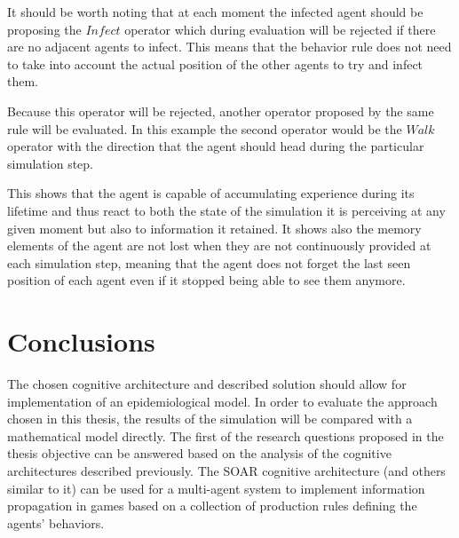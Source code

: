 It should be worth noting that at each moment the infected agent should be proposing the $Infect$ operator which during evaluation will be rejected if there are no adjacent agents to infect.
This means that the behavior rule does not need to take into account the actual position of the other agents to try and infect them.

Because this operator will be rejected, another operator proposed by the same rule will be evaluated.
In this example the second operator would be the $Walk$ operator with the direction that the agent should head during the particular simulation step.

This shows that the agent is capable of accumulating experience during its lifetime and thus react to both the state of the simulation it is perceiving at any given moment but also to information it retained.
It shows also the memory elements of the agent are not lost when they are not continuously provided at each simulation step, meaning that the agent does not forget the last seen position of each agent even if it stopped being able to see them anymore.

\section{Conclusions}

The chosen cognitive architecture and described solution should allow for implementation of an epidemiological model.
In order to evaluate the approach chosen in this thesis, the results of the simulation will be compared with a mathematical model directly.
The first of the research questions proposed in the thesis objective can be answered based on the analysis of the cognitive architectures described previously.
The SOAR cognitive architecture (and others similar to it) can be used for a multi-agent system to implement information propagation in games based on a collection of production rules defining the agents' behaviors.
